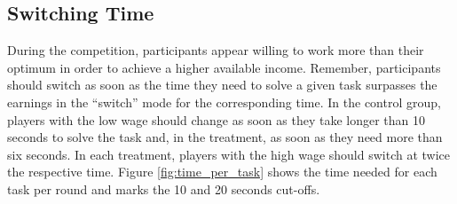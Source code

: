 

\subsection{Switching Time}
During the competition, participants appear willing to work more than their optimum in order to achieve a higher available income. Remember, participants should switch as soon as the time they need to solve a given task surpasses the earnings in the ``switch'' mode for the corresponding time. In the control group, players with the low wage should change as soon as they take longer than 10 seconds to solve the task and, in the treatment, as soon as they need more than six seconds. In each treatment, players with the high wage should switch at twice the respective time. Figure \ref{fig:time_per_task} shows the time needed for each task per round and marks the 10 and 20 seconds cut-offs.\\

